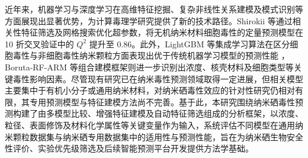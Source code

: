 近年来，机器学习与深度学习在高维特征挖掘、复杂非线性关系建模及模式识别等方面展现出显著优势，为计算毒理学研究提供了新的技术路径\cite{hosni2025mlnp}。Shirokii 等通过相关性特征筛选及网格搜索优化超参数，将无机纳米材料细胞毒性的定量预测模型在 10 折交叉验证中的 $Q^2$ 提升至 0.86\cite{shirokii2023quantitative}。此外，LightGBM 等集成学习算法在区分细胞毒性与非细胞毒性纳米颗粒方面表现出优于传统机器学习模型的预测性能\cite{hosni2025mlnp}
，Boruta-RF-ARM 等组合建模框架则进一步识别出浓度、核壳材料及细胞类型等关键毒性影响因素\cite{yildirim2025rheumatoid}。尽管现有研究已在纳米毒性预测领域取得一定进展，但相关模型主要集中于有机小分子或通用纳米材料，对纳米硒毒性效应的针对性研究仍相对有限，其专用预测模型与特征建模方法尚不完善。基于此，本研究围绕纳米硒毒性预测构建了由多模型比较、增强特征建模及自动特征筛选组成的分析框架，以浓度、粒径、表面修饰及材料化学属性等关键变量作为输入，系统评估不同模型在通用纳米颗粒数据集与纳米硒专用数据集中的适用性与预测性能，旨在为纳米硒生物安全性评价、实验优先级筛选及后续智能预测平台开发提供方法学基础。

